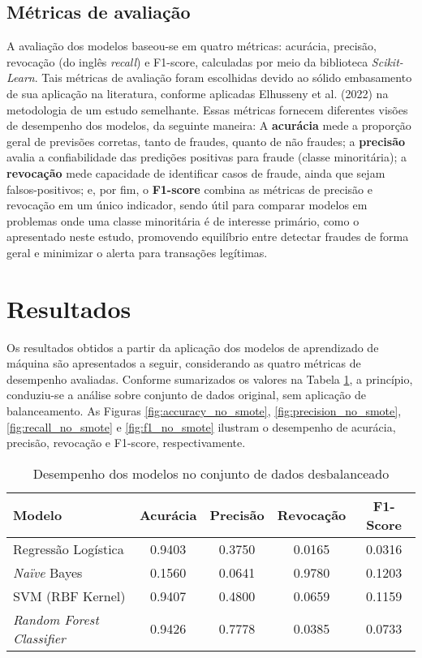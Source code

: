 \documentclass[conference]{IEEEtran}
\begin{document}
\subsection{Métricas de avaliação}
A avaliação dos modelos baseou-se em quatro métricas: acurácia, precisão, revocação (do inglês \textit{recall}) e F1-score, calculadas por meio da biblioteca \textit{Scikit-Learn}. Tais métricas de avaliação foram escolhidas devido ao sólido embasamento de sua aplicação na literatura, conforme aplicadas Elhusseny et al. (2022)\cite{b6} na metodologia de um estudo semelhante. Essas métricas fornecem diferentes visões de desempenho dos modelos, da seguinte maneira: A \textbf{acurácia} mede a proporção geral de previsões corretas, tanto de fraudes, quanto de não fraudes; a \textbf{precisão} avalia a confiabilidade das predições positivas para fraude (classe minoritária); a \textbf{revocação} mede capacidade de identificar casos de fraude, ainda que sejam falsos-positivos; e, por fim, o \textbf{F1-score} combina as métricas de precisão e revocação em um único indicador, sendo útil para comparar modelos em problemas onde uma classe minoritária é de interesse primário, como o apresentado neste estudo, promovendo equilíbrio entre detectar fraudes de forma geral e minimizar o alerta para transações legítimas.

\section{Resultados}

Os resultados obtidos a partir da aplicação dos modelos de aprendizado de máquina são apresentados a seguir, considerando as quatro métricas de desempenho avaliadas. Conforme sumarizados os valores na Tabela \ref{tab:resultados_desbalanceados}, a princípio, conduziu-se a análise sobre conjunto de dados original, sem aplicação de balanceamento. As Figuras \ref{fig:accuracy_no_smote}, \ref{fig:precision_no_smote}, \ref{fig:recall_no_smote} e \ref{fig:f1_no_smote} ilustram o desempenho de acurácia, precisão, revocação e F1-score, respectivamente.

\begin{table}[h]
\centering
\caption{Desempenho dos modelos no conjunto de dados desbalanceado}
\label{tab:resultados_desbalanceados}
    \begin{tabular}{lcccc}
        \hline
        Modelo & Acurácia & Precisão & Revocação & F1-Score \\ \hline
        Regressão Logística & 0.9403 & 0.3750 & 0.0165 & 0.0316 \\
        \textit{Naïve} Bayes & 0.1560 & 0.0641 & 0.9780 & 0.1203 \\
        SVM (RBF Kernel) & 0.9407 & 0.4800 & 0.0659 & 0.1159 \\
        \textit{Random Forest Classifier}& 0.9426 & 0.7778 & 0.0385 & 0.0733 \\
    \end{tabular}
\end{table}
\end{document}
